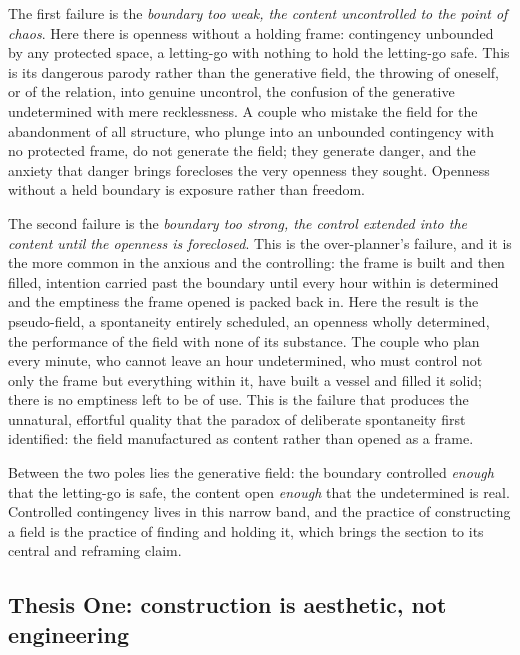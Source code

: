 The first failure is the \emph{boundary too weak, the content uncontrolled to the point of chaos}. Here there is openness without a holding frame: contingency unbounded by any protected space, a letting-go with nothing to hold the letting-go safe. This is its dangerous parody rather than the generative field, the throwing of oneself, or of the relation, into genuine uncontrol, the confusion of the generative undetermined with mere recklessness. A couple who mistake the field for the abandonment of all structure, who plunge into an unbounded contingency with no protected frame, do not generate the field; they generate danger, and the anxiety that danger brings forecloses the very openness they sought. Openness without a held boundary is exposure rather than freedom.

The second failure is the \emph{boundary too strong, the control extended into the content until the openness is foreclosed}. This is the over-planner's failure, and it is the more common in the anxious and the controlling: the frame is built and then filled, intention carried past the boundary until every hour within is determined and the emptiness the frame opened is packed back in. Here the result is the pseudo-field, a spontaneity entirely scheduled, an openness wholly determined, the performance of the field with none of its substance. The couple who plan every minute, who cannot leave an hour undetermined, who must control not only the frame but everything within it, have built a vessel and filled it solid; there is no emptiness left to be of use. This is the failure that produces the unnatural, effortful quality that the paradox of deliberate spontaneity first identified: the field manufactured as content rather than opened as a frame.

Between the two poles lies the generative field: the boundary controlled \emph{enough} that the letting-go is safe, the content open \emph{enough} that the undetermined is real. Controlled contingency lives in this narrow band, and the practice of constructing a field is the practice of finding and holding it, which brings the section to its central and reframing claim.

\subsection{Thesis One: construction is aesthetic, not engineering}
\label{p21:sub:constr-thesis}

